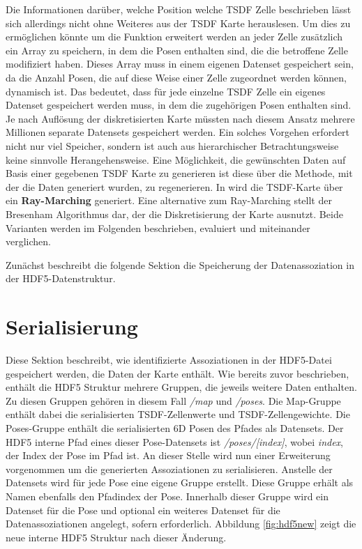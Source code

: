 Die Informationen darüber, welche Position welche TSDF Zelle beschrieben lässt sich allerdings nicht ohne Weiteres aus der TSDF Karte herauslesen.
Um dies zu ermöglichen könnte \cite{HATSDF} um die Funktion erweitert werden an jeder Zelle zusätzlich ein Array zu speichern, in dem die Posen enthalten sind, die die betroffene Zelle modifiziert haben. Dieses Array muss in einem eigenen Datenset gespeichert sein, da die Anzahl Posen, die auf diese Weise einer Zelle zugeordnet werden können, dynamisch ist. Das bedeutet, dass für jede einzelne TSDF Zelle ein eigenes Datenset gespeichert werden muss, in dem die zugehörigen Posen enthalten sind. Je nach Auflösung der diskretisierten Karte müssten nach diesem Ansatz mehrere Millionen separate Datensets gespeichert werden. Ein solches Vorgehen erfordert nicht nur viel Speicher, sondern ist auch aus hierarchischer Betrachtungsweise keine sinnvolle Herangehensweise.
Eine Möglichkeit, die gewünschten Daten auf Basis einer gegebenen TSDF Karte zu generieren ist diese über die Methode, mit der die Daten generiert wurden, zu regenerieren. In \cite{HATSDF} wird die TSDF-Karte über ein \textbf{Ray-Marching} generiert. Eine alternative zum Ray-Marching stellt der Bresenham Algorithmus dar, der die Diskretisierung der Karte ausnutzt.
Beide Varianten werden im Folgenden beschrieben, evaluiert und miteinander verglichen.

Zunächst beschreibt die folgende Sektion die Speicherung der Datenassoziation in der HDF5-Datenstruktur.

\section{Serialisierung}

Diese Sektion beschreibt, wie identifizierte Assoziationen in der HDF5-Datei gespeichert werden, die Daten der Karte enthält.
Wie bereits zuvor beschrieben, enthält die HDF5 Struktur mehrere Gruppen, die jeweils weitere Daten enthalten. Zu diesen Gruppen gehören in diesem Fall \textit{/map} und \textit{/poses}.
Die Map-Gruppe enthält dabei die serialisierten TSDF-Zellenwerte und TSDF-Zellengewichte. Die Poses-Gruppe enthält die serialisierten 6D Posen des Pfades als Datensets.
Der HDF5 interne Pfad eines dieser Pose-Datensets ist \textit{/poses/[index]}, wobei \textit{index}, der Index der Pose im Pfad ist.
An dieser Stelle wird nun einer Erweiterung vorgenommen um die generierten Assoziationen zu serialisieren. Anstelle der Datensets wird für jede Pose eine eigene Gruppe erstellt. Diese Gruppe erhält als Namen ebenfalls den Pfadindex der Pose. Innerhalb dieser Gruppe wird ein Datenset für die Pose und optional ein weiteres Datenset für die Datenassoziationen angelegt, sofern erforderlich.
Abbildung \ref{fig:hdf5new} zeigt die neue interne HDF5 Struktur nach dieser Änderung.

